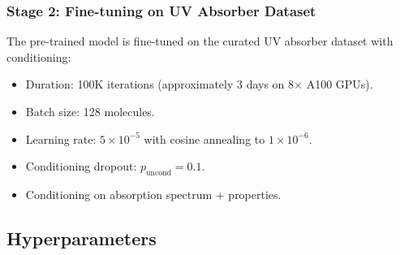 \documentclass[12pt,a4paper]{article}
\begin{document}
\subsubsection{Stage 2: Fine-tuning on UV Absorber Dataset}

The pre-trained model is fine-tuned on the curated UV absorber dataset with conditioning:
\begin{itemize}
    \item Duration: 100K iterations (approximately 3 days on 8$\times$ A100 GPUs).
    \item Batch size: 128 molecules.
    \item Learning rate: $5 \times 10^{-5}$ with cosine annealing to $1 \times 10^{-6}$.
    \item Conditioning dropout: $p_{\text{uncond}} = 0.1$.
    \item Conditioning on absorption spectrum + properties.
\end{itemize}

\subsection{Hyperparameters}\label{sec:hyperparams}
\end{document}
